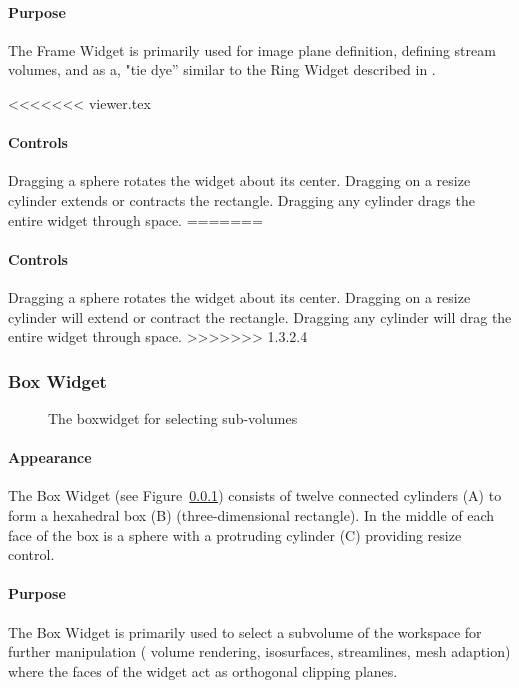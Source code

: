 \paragraph{Purpose} The Frame Widget is primarily used for image
plane definition, defining stream volumes, and as a, "tie dye'' similar to
the Ring Widget described in .

<<<<<<< viewer.tex
\paragraph{Controls} Dragging a sphere rotates the widget about its center. Dragging on a resize cylinder extends or contracts the rectangle.
Dragging any cylinder drags the entire widget through space.
=======
\paragraph{Controls} Dragging a sphere rotates the widget about its center. Dragging on a resize cylinder will extend or contract the rectangle.
Dragging any cylinder will drag the entire widget through space.
>>>>>>> 1.3.2.4


\subsubsection{Box Widget}
\label{sec:view-boxwidget} 

\begin{figure}[htb]
  \begin{makeimage}
  \end{makeimage}
  \boxwidget
  \caption{\label{fig:boxwidget} The boxwidget for selecting sub-volumes}
\end{figure}

\paragraph{Appearance} The Box
Widget (see Figure~\ref{sec:view-boxwidget}) consists of twelve 
connected cylinders (A) to form a hexahedral box (B) (three-dimensional
rectangle).  In the middle of each face of the box is a sphere with a protruding cylinder (C) providing resize control.

\paragraph{Purpose} The Box Widget is primarily used to select a
subvolume of the workspace for further manipulation (\eg{} volume
rendering, isosurfaces, streamlines, mesh adaption) where the faces of the
widget act as orthogonal clipping planes.

